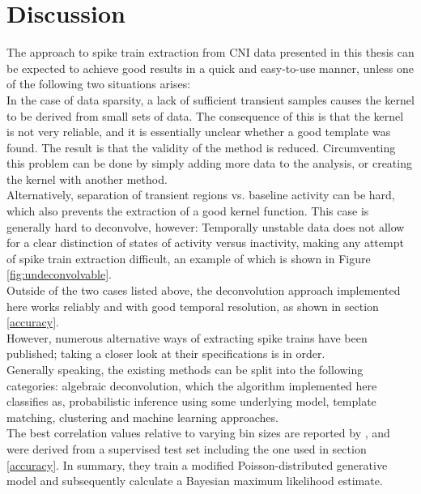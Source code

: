 \documentclass[titlepage]{article}
\begin{document}
\section{Discussion}
The approach to spike train extraction from CNI data presented in this thesis can be expected to achieve good results in a quick and easy-to-use manner, unless one of the following two situations arises:\\
In the case of data sparsity, a lack of sufficient transient samples causes the kernel to be derived from small sets of data. The consequence of this is that the kernel is not very reliable, and it is essentially unclear whether a good template was found. The result is that the validity of the method is reduced. Circumventing this problem can be done by simply adding more data to the analysis, or creating the kernel with another method.\\
Alternatively, separation of transient regions vs. baseline activity can be hard, which also prevents the extraction of a good kernel function. This case is generally hard to deconvolve, however: Temporally unstable data does not allow for a clear distinction of states of activity versus inactivity, making any attempt of spike train extraction difficult, an example of which is shown in Figure \ref{fig:undeconvolvable}.\\
Outside of the two cases listed above, the deconvolution approach implemented here works reliably and with good temporal resolution, as shown in section \ref{accuracy}.\\
However, numerous alternative ways of extracting spike trains have been published; taking a closer look at their specifications is in order.\\
Generally speaking, the existing methods can be split into the following categories:
algebraic deconvolution\cite{yaksi_reconstruction_2006}\cite{friedrich_fast_2017}, which the algorithm implemented here classifies as, probabilistic inference using some underlying model\cite{ranganathan_optical_2010}\cite{sasaki_fast_2008}\cite{vogelstein_spike_2009}\cite{deneux_accurate_2016}, template matching\cite{kerr_imaging_2005}, clustering\cite{ozden_identification_2008}\cite{romano_integrated_2017} and machine learning approaches\cite{theis_benchmarking_2016}.\\
The best correlation values relative to varying bin sizes are reported by \citeauthor{theis_benchmarking_2016}\cite{theis_benchmarking_2016}, and were derived from a supervised test set including the one used in section \ref{accuracy}. In summary, they train a modified Poisson-distributed generative model and subsequently calculate a Bayesian maximum likelihood estimate.\\ 
\end{document}
